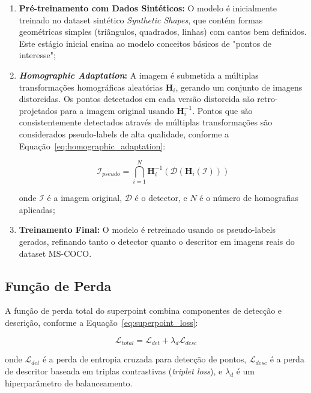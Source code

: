 \begin{enumerate}
    \item \textbf{Pré-treinamento com Dados Sintéticos:} O modelo é inicialmente treinado no dataset sintético \textit{Synthetic Shapes}, que contém formas geométricas simples (triângulos, quadrados, linhas) com cantos bem definidos. Este estágio inicial ensina ao modelo conceitos básicos de "pontos de interesse";
    
    \item \textbf{\textit{Homographic Adaptation}:} A imagem é submetida a múltiplas transformações homográficas aleatórias $\mathbf{H}_i$, gerando um conjunto de imagens distorcidas. Os pontos detectados em cada versão distorcida são retro-projetados para a imagem original usando $\mathbf{H}_i^{-1}$. Pontos que são consistentemente detectados através de múltiplas transformações são considerados pseudo-labels de alta qualidade, conforme a Equação~\ref{eq:homographic_adaptation}:
    
    \begin{equation}
    \label{eq:homographic_adaptation}
    \mathcal{I}_{pseudo} = \bigcap_{i=1}^{N} \mathbf{H}_i^{-1}(\mathcal{D}(\mathbf{H}_i(\mathcal{I})))
    \end{equation}
    
    \noindent onde $\mathcal{I}$ é a imagem original, $\mathcal{D}$ é o detector, e $N$ é o número de homografias aplicadas;
    
    \item \textbf{Treinamento Final:} O modelo é retreinado usando os pseudo-labels gerados, refinando tanto o detector quanto o descritor em imagens reais do dataset MS-COCO.
\end{enumerate}

\subsection*{Função de Perda}

A função de perda total do \gls{superpoint} combina componentes de detecção e descrição, conforme a Equação~\ref{eq:superpoint_loss}:

\begin{equation}
\label{eq:superpoint_loss}
\mathcal{L}_{total} = \mathcal{L}_{det} + \lambda_d \mathcal{L}_{desc}
\end{equation}

\noindent onde $\mathcal{L}_{det}$ é a perda de entropia cruzada para detecção de pontos, $\mathcal{L}_{desc}$ é a perda de descritor baseada em triplas contrastivas (\textit{triplet loss}), e $\lambda_d$ é um hiperparâmetro de balanceamento.

